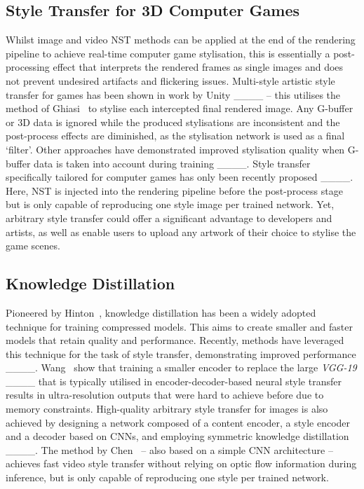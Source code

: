 \subsection{Style Transfer for 3D Computer Games}

Whilst image and video NST methods can be applied at the end of the rendering pipeline to achieve real-time computer game stylisation, this is essentially a post-processing effect that interprets the rendered frames as single images and does not prevent undesired artifacts and flickering issues. Multi-style artistic style transfer for games has been shown in work by Unity ____ -- this utilises the method of Ghiasi~\etal {} to stylise each intercepted final rendered image. Any G-buffer or 3D data is ignored while the produced stylisations are inconsistent and the post-process effects are diminished, as the stylisation network is used as a final `filter'. Other approaches have demonstrated improved stylisation quality when G-buffer data is taken into account during training ____. Style transfer specifically tailored for computer games has only been recently proposed ____. Here, NST is injected into the rendering pipeline before the post-process stage but is only capable of reproducing one style image per trained network. Yet, arbitrary style transfer could offer a significant advantage to developers and artists, as well as enable users to upload any artwork of their choice to stylise the game scenes.


\subsection{Knowledge Distillation}
Pioneered by Hinton~\etal {}, knowledge distillation has been a widely adopted technique for training compressed models. This aims to create smaller and faster models that retain quality and performance. Recently, methods have leveraged this technique for the task of style transfer, demonstrating improved performance ____. Wang~\etal {} show that training a smaller encoder to replace the large \textit{VGG-19} ____ that is typically utilised in encoder-decoder-based neural style transfer results in ultra-resolution outputs that were hard to achieve before due to memory constraints. High-quality arbitrary style transfer for images is also achieved by designing a network composed of a content encoder, a style encoder and a decoder based on CNNs, and employing symmetric knowledge distillation ____. The method by Chen~\etal {} -- also based on a simple CNN architecture -- achieves fast video style transfer without relying on optic flow information during inference, but is only capable of reproducing one style per trained network.